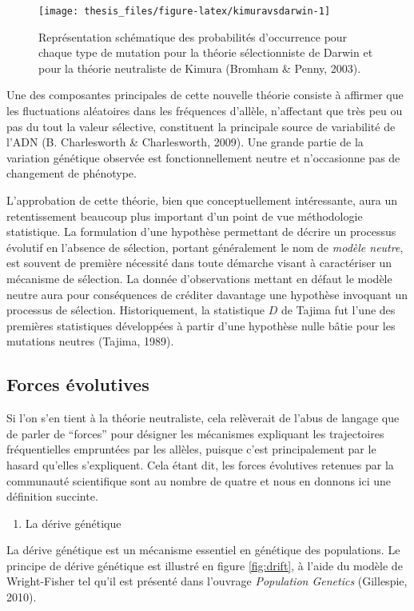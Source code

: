 \documentclass[12pt,a4paper,twoside]{ugathesis}
\providecommand{\tightlist}{%
  \setlength{\itemsep}{0pt}\setlength{\parskip}{0pt}}
\theoremstyle{definition}
\theoremstyle{definition}
\theoremstyle{remark}
\begin{document}
\begin{figure}

{\centering \texttt{[image: thesis\_files/figure-latex/kimuravsdarwin-1]} 

}

\caption{Représentation schématique des probabilités
d'occurrence pour chaque type de mutation pour la théorie sélectionniste
de Darwin et pour la théorie neutraliste de Kimura (Bromham \& Penny,
2003).}\label{fig:kimuravsdarwin}
\end{figure}
Une des composantes principales de cette nouvelle théorie consiste à
affirmer que les fluctuations aléatoires dans les fréquences d'allèle,
n'affectant que très peu ou pas du tout la valeur sélective, constituent
la principale source de variabilité de l'ADN (B. Charlesworth \&
Charlesworth, 2009). Une grande partie de la variation génétique
observée est fonctionnellement neutre et n'occasionne pas de changement
de phénotype.

L'approbation de cette théorie, bien que conceptuellement intéressante,
aura un retentissement beaucoup plus important d'un point de vue
méthodologie statistique. La formulation d'une hypothèse permettant de
décrire un processus évolutif en l'absence de sélection, portant
généralement le nom de \emph{modèle neutre}, est souvent de première
nécessité dans toute démarche visant à caractériser un mécanisme de
sélection. La donnée d'observations mettant en défaut le modèle neutre
aura pour conséquences de créditer davantage une hypothèse invoquant un
processus de sélection. Historiquement, la statistique \(D\) de Tajima
fut l'une des premières statistiques développées à partir d'une
hypothèse nulle bâtie pour les mutations neutres (Tajima, 1989).

\subsection{Forces évolutives}\label{forces-evolutives}

Si l'on s'en tient à la théorie neutraliste, cela relèverait de l'abus
de langage que de parler de ``forces'' pour désigner les mécanismes
expliquant les trajectoires fréquentielles empruntées par les allèles,
puisque c'est principalement par le hasard qu'elles s'expliquent. Cela
étant dit, les forces évolutives retenues par la communauté scientifique
sont au nombre de quatre et nous en donnons ici une définition succinte.
\begin{enumerate}
\def\labelenumi{\arabic{enumi}.}
\tightlist
\item
  La dérive génétique
\end{enumerate}
La dérive génétique est un mécanisme essentiel en génétique des
populations. Le principe de dérive génétique est illustré en figure
\ref{fig:drift}, à l'aide du modèle de Wright-Fisher tel qu'il est
présenté dans l'ouvrage \emph{Population Genetics} (Gillespie, 2010).
\end{document}

